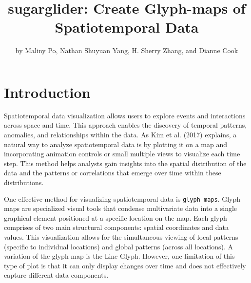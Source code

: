 \title{sugarglider: Create Glyph-maps of Spatiotemporal Data}


\author{by Maliny Po, Nathan Shuyuan Yang, H. Sherry Zhang, and Dianne Cook}

\maketitle


\hypertarget{introduction}{%
\section{Introduction}\label{introduction}}

Spatiotemporal data visualization allows users to explore events and interactions across space and time. This approach enables the discovery of temporal patterns, anomalies, and relationships within the data. As Kim et al. (2017) explains, a natural way to analyze spatiotemporal data is by plotting it on a map and incorporating animation controls or small multiple views to visualize each time step. This method helps analysts gain insights into the spatial distribution of the data and the patterns or correlations that emerge over time within these distributions.

One effective method for visualizing spatiotemporal data is \texttt{glyph\ maps}. Glyph maps are specialized visual tools that condense multivariate data into a single graphical element positioned at a specific location on the map. Each glyph comprises of two main structural components: spatial coordinates and data values. This visualization allows for the simultaneous viewing of local patterns (specific to individual locations) and global patterns (across all locations). A variation of the glyph map is the Line Glyph. However, one limitation of this type of plot is that it can only display changes over time and does not effectively capture different data components.

